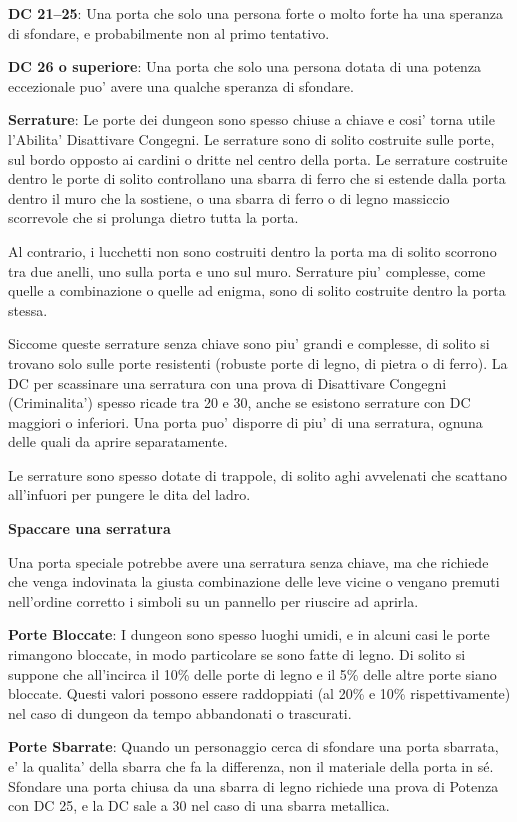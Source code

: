 \documentclass[a4paper,11pt,twoside,openany]{book}
\begin{document}
\textbf{DC 21--25}: Una porta che solo una persona forte o molto forte ha una speranza di sfondare, e probabilmente non al primo tentativo. 

\textbf{DC 26 o superiore}: Una porta che solo una persona dotata di una potenza eccezionale puo' avere una qualche speranza di sfondare.

\textbf{Serrature}: Le porte dei dungeon sono spesso chiuse a chiave e cosi' torna utile l'Abilita' Disattivare Congegni. Le serrature sono di solito costruite sulle porte, sul bordo opposto ai cardini o dritte nel centro della porta. Le serrature costruite dentro le porte di solito controllano una sbarra di ferro che si estende dalla porta dentro il muro che la sostiene, o una sbarra di ferro o di legno massiccio scorrevole che si prolunga dietro tutta la porta. 

Al contrario, i lucchetti non sono costruiti dentro la porta ma di solito scorrono tra due anelli, uno sulla porta e uno sul muro. Serrature piu' complesse, come quelle a combinazione o quelle ad enigma, sono di solito costruite dentro la porta stessa. 

Siccome queste serrature senza chiave sono piu' grandi e complesse, di solito si trovano solo sulle porte resistenti (robuste porte di legno, di pietra o di ferro). 
La DC per scassinare una serratura con una prova di Disattivare Congegni (Criminalita') spesso ricade tra 20 e 30, anche se esistono serrature con DC maggiori o inferiori. Una porta puo' disporre di piu' di una serratura, ognuna delle quali da aprire separatamente.

Le serrature sono spesso dotate di trappole, di solito aghi avvelenati che scattano all'infuori per pungere le dita del ladro.

\textbf{Spaccare una serratura}

Una porta speciale potrebbe avere una serratura senza chiave, ma che richiede che venga indovinata la giusta combinazione delle leve vicine o vengano premuti nell'ordine corretto i simboli su un pannello per riuscire ad aprirla.

\textbf{Porte Bloccate}: I dungeon sono spesso luoghi umidi, e in alcuni casi le porte rimangono bloccate, in modo particolare se sono fatte di legno. Di solito si suppone che all'incirca il 10\% delle porte di legno e il 5\% delle altre porte siano bloccate. Questi valori possono essere raddoppiati (al 20\% e 10\% rispettivamente) nel caso di dungeon da tempo abbandonati o trascurati.

\textbf{Porte Sbarrate}: Quando un personaggio cerca di sfondare una porta sbarrata, e' la qualita' della sbarra che fa la differenza, non il materiale della porta in sé. Sfondare una porta chiusa da una sbarra di legno richiede una prova di Potenza con DC 25, e la DC sale a 30 nel caso di una sbarra metallica.
\end{document}

